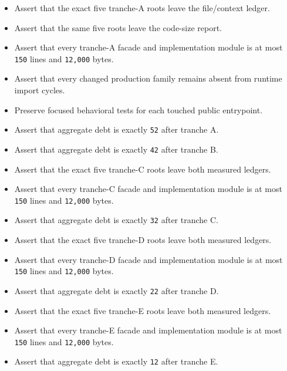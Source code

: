 \begin{itemize}
\tightlist
\item
  Assert that the exact five tranche-A roots leave the file/context ledger.
\item
  Assert that the same five roots leave the code-size report.
\item
  Assert that every tranche-A facade and implementation module is at most \texttt{1\allowbreak{}5\allowbreak{}0} lines and \texttt{1\allowbreak{}2\allowbreak{},\allowbreak{}0\allowbreak{}0\allowbreak{}0} bytes.
\item
  Assert that every changed production family remains absent from runtime import cycles.
\item
  Preserve focused behavioral tests for each touched public entrypoint.
\item
  Assert that aggregate debt is exactly \texttt{5\allowbreak{}2} after tranche A.
\item
  Assert that aggregate debt is exactly \texttt{4\allowbreak{}2} after tranche B.
\item
  Assert that the exact five tranche-C roots leave both measured ledgers.
\item
  Assert that every tranche-C facade and implementation module is at most \texttt{1\allowbreak{}5\allowbreak{}0} lines and \texttt{1\allowbreak{}2\allowbreak{},\allowbreak{}0\allowbreak{}0\allowbreak{}0} bytes.
\item
  Assert that aggregate debt is exactly \texttt{3\allowbreak{}2} after tranche C.
\item
  Assert that the exact five tranche-D roots leave both measured ledgers.
\item
  Assert that every tranche-D facade and implementation module is at most \texttt{1\allowbreak{}5\allowbreak{}0} lines and \texttt{1\allowbreak{}2\allowbreak{},\allowbreak{}0\allowbreak{}0\allowbreak{}0} bytes.
\item
  Assert that aggregate debt is exactly \texttt{2\allowbreak{}2} after tranche D.
\item
  Assert that the exact five tranche-E roots leave both measured ledgers.
\item
  Assert that every tranche-E facade and implementation module is at most \texttt{1\allowbreak{}5\allowbreak{}0} lines and \texttt{1\allowbreak{}2\allowbreak{},\allowbreak{}0\allowbreak{}0\allowbreak{}0} bytes.
\item
  Assert that aggregate debt is exactly \texttt{1\allowbreak{}2} after tranche E.
\end{itemize}

